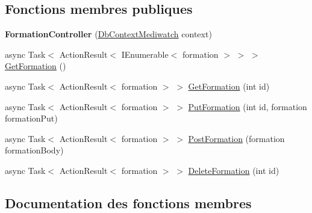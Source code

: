 \subsection*{Fonctions membres publiques}
\begin{DoxyCompactItemize}
\item 
\mbox{\label{class_mediwatch_1_1_server_1_1_controllers_1_1_formation_controller_a71430327b82736d6b252d83a40833dbd}} 
{\bfseries Formation\+Controller} (\hyperlink{class_server_1_1_db_context_mediwatch}{Db\+Context\+Mediwatch} context)
\item 
async Task$<$ Action\+Result$<$ I\+Enumerable$<$ formation $>$ $>$ $>$ \hyperlink{class_mediwatch_1_1_server_1_1_controllers_1_1_formation_controller_ac1711d7a1c8bbd44715fc57cb945c93c}{Get\+Formation} ()
\item 
async Task$<$ Action\+Result$<$ formation $>$ $>$ \hyperlink{class_mediwatch_1_1_server_1_1_controllers_1_1_formation_controller_aecf887fc57ba8ee1af0ba1be7703738a}{Get\+Formation} (int id)
\item 
async Task$<$ Action\+Result$<$ formation $>$ $>$ \hyperlink{class_mediwatch_1_1_server_1_1_controllers_1_1_formation_controller_ac56853c9a6cf3b7cb2303d1c6bf8a037}{Put\+Formation} (int id, formation formation\+Put)
\item 
async Task$<$ Action\+Result$<$ formation $>$ $>$ \hyperlink{class_mediwatch_1_1_server_1_1_controllers_1_1_formation_controller_a2710e701c2d495ee6a1d343a5303bfa3}{Post\+Formation} (formation formation\+Body)
\item 
async Task$<$ Action\+Result$<$ formation $>$ $>$ \hyperlink{class_mediwatch_1_1_server_1_1_controllers_1_1_formation_controller_af3e300009a2f7d0d1551da387effbe09}{Delete\+Formation} (int id)
\end{DoxyCompactItemize}


\subsection{Documentation des fonctions membres}
\mbox{\label{class_mediwatch_1_1_server_1_1_controllers_1_1_formation_controller_af3e300009a2f7d0d1551da387effbe09}} 
